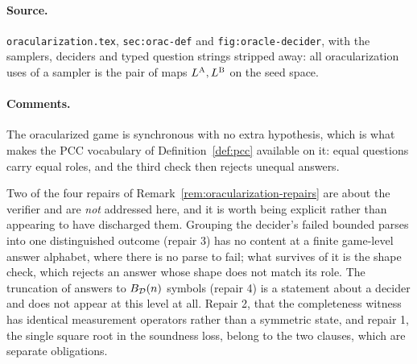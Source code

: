 \paragraph{Source.} \texttt{oracularization.tex}, \texttt{sec:orac-def} and
\texttt{fig:oracle-decider}, with the samplers, deciders and typed question strings stripped
away: all oracularization uses of a sampler is the pair of maps $L^{\textsc{A}}, L^{\textsc{B}}$ on the seed
space.

\paragraph{Comments.} The oracularized game is synchronous with no extra hypothesis, which is
what makes the PCC vocabulary of Definition~\ref{def:pcc} available on it: equal questions
carry equal roles, and the third check then rejects unequal answers.

Two of the four repairs of Remark~\ref{rem:oracularization-repairs} are about the verifier and
are \emph{not} addressed here, and it is worth being explicit rather than appearing to have
discharged them. Grouping the decider's failed bounded parses into one distinguished outcome
(repair 3) has no content at a finite game-level answer alphabet, where there is no parse to
fail; what survives of it is the shape check, which rejects an answer whose shape does not
match its role. The truncation of answers to $B_{\mathcal{D}}(n)$ symbols (repair 4) is a statement
about a decider and does not appear at this level at all. Repair 2, that the completeness
witness has identical measurement operators rather than a symmetric state, and repair 1, the
single square root in the soundness loss, belong to the two clauses, which are separate
obligations.

